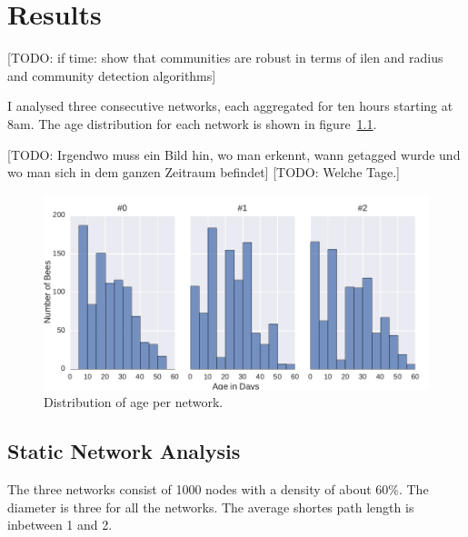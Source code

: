 \chapter{Results}

[TODO: if time: show that communities are robust in terms of ilen and radius and community detection algorithms]

I analysed three consecutive networks, each aggregated for ten hours starting at 8am. The age distribution for each network is shown in figure~\ref{fig:ages}.

[TODO: Irgendwo muss ein Bild hin, wo man erkennt, wann getagged wurde und wo man sich in dem ganzen Zeitraum befindet]
[TODO: Welche Tage.]


\begin{figure}[htb]
	\centering
	\includegraphics[width=1.0\textwidth]{Figures/ages}
	\caption[Distribution of gge per Network]{Distribution of age per network.}
	\label{fig:ages}
\end{figure}


\section{Static Network Analysis}

The three networks consist of 1000 nodes with a density of about 60\%. The diameter is three for all the networks. The average shortes path length is inbetween 1 and 2. 

